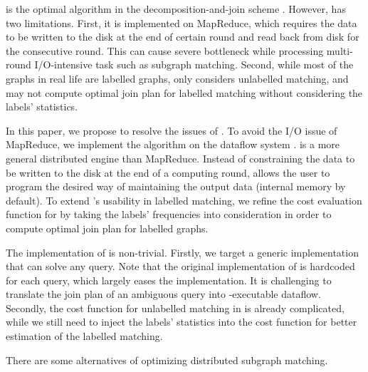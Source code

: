  \cliquejoin is the optimal algorithm in the decomposition-and-join scheme \cite{Lai2016}. However, \cliquejoin has two limitations. First, it is implemented on MapReduce, which requires the data to be written to the disk at the end of certain round and read back from disk for the consecutive round. This can cause severe bottleneck while processing multi-round I/O-intensive task such as subgraph matching. Second, while most of the graphs in real life are labelled graphs, \cliquejoin only considers unlabelled matching, and may not compute optimal join plan for labelled matching without considering the labels' statistics.

In this paper, we propose \gencliqjoin to resolve the issues of \cliquejoin. To avoid the I/O issue of MapReduce, we implement the algorithm on the \timely dataflow system \cite{Murray2013}. \timely is a more general distributed engine than MapReduce. Instead of constraining the data to be written to the disk at the end of a computing round, \timely allows the user to program the desired way of maintaining the output data (internal memory by default). To extend \cliquejoin's usability in labelled matching, we refine the cost evaluation function for \cliquejoin by taking the labels' frequencies into consideration in order to compute optimal join plan for labelled graphs.

The implementation of \gencliqjoin is non-trivial. Firstly, we target a generic implementation that can solve any query. Note that the original implementation of \cliquejoin is hardcoded for each query, which largely eases the implementation. It is challenging to translate the join plan of an ambiguous query into \timely-executable dataflow. Secondly, the cost function for unlabelled matching in \cliquejoin is already complicated, while we still need to inject the labels' statistics into the cost function for better estimation of the labelled matching.

There are some alternatives of optimizing distributed subgraph matching.

